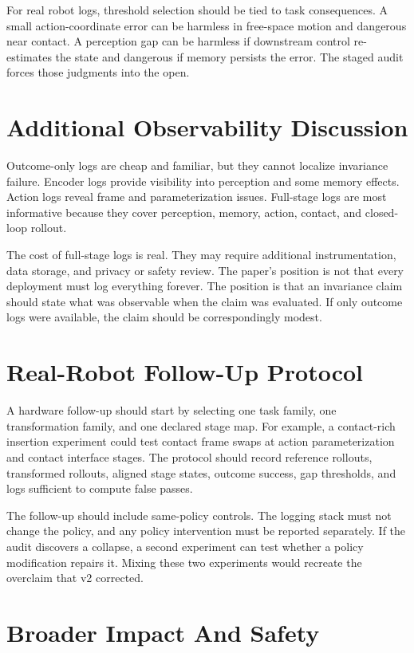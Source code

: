 \documentclass{article}
\begin{document}
For real robot logs, threshold selection should be tied to task consequences. A small action-coordinate error can be harmless in free-space motion and dangerous near contact. A perception gap can be harmless if downstream control re-estimates the state and dangerous if memory persists the error. The staged audit forces those judgments into the open.

\section{Additional Observability Discussion}

Outcome-only logs are cheap and familiar, but they cannot localize invariance failure. Encoder logs provide visibility into perception and some memory effects. Action logs reveal frame and parameterization issues. Full-stage logs are most informative because they cover perception, memory, action, contact, and closed-loop rollout.

The cost of full-stage logs is real. They may require additional instrumentation, data storage, and privacy or safety review. The paper's position is not that every deployment must log everything forever. The position is that an invariance claim should state what was observable when the claim was evaluated. If only outcome logs were available, the claim should be correspondingly modest.

\section{Real-Robot Follow-Up Protocol}

A hardware follow-up should start by selecting one task family, one transformation family, and one declared stage map. For example, a contact-rich insertion experiment could test contact frame swaps at action parameterization and contact interface stages. The protocol should record reference rollouts, transformed rollouts, aligned stage states, outcome success, gap thresholds, and logs sufficient to compute false passes.

The follow-up should include same-policy controls. The logging stack must not change the policy, and any policy intervention must be reported separately. If the audit discovers a collapse, a second experiment can test whether a policy modification repairs it. Mixing these two experiments would recreate the overclaim that v2 corrected.

\section{Broader Impact And Safety}
\end{document}
